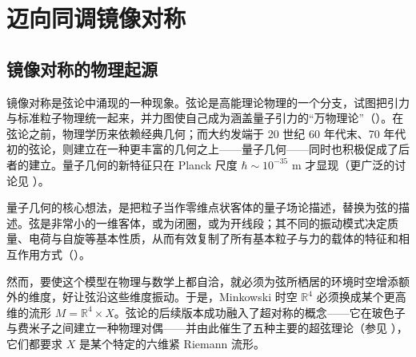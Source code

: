 \section{迈向同调镜像对称}\label{ch:07}

\setcounter{equation}{100}


\subsection{镜像对称的物理起源}\label{sec:7.1}

镜像对称是弦论中涌现的一种现象。弦论是高能理论物理的一个分支，试图把引力与标准粒子物理统一起来，并力图使自己成为涵盖量子引力的“万物理论”（\cite{BBS07}）。在弦论之前，物理学历来依赖经典几何；而大约发端于 20 世纪 60 年代末、70 年代初的弦论，则建立在一种更丰富的几何之上——量子几何——同时也积极促成了后者的建立。量子几何的新特征只在 Planck 尺度 $\hbar\sim10^{-35}$ m 才显现（更广泛的讨论见 \cite{Gre97}）。

量子几何的核心想法，是把粒子当作零维点状客体的量子场论描述，替换为弦的描述。弦是非常小的一维客体，或为闭圈，或为开线段；其不同的振动模式决定质量、电荷与自旋等基本性质，从而有效复制了所有基本粒子与力的载体的特征和相互作用方式（\cite{BBS07}）。

然而，要使这个模型在物理与数学上都自洽，就必须为弦所栖居的环境时空增添额外的维度，好让弦沿这些维度振动。于是，Minkowski 时空 $\mathbb R^4$ 必须换成某个更高维的流形 $M=\mathbb R^4\times X$。弦论的后续版本成功融入了超对称的概念——它在玻色子与费米子之间建立一种物理对偶——并由此催生了五种主要的超弦理论（参见 \cite{Zwi09}），它们都要求 $X$ 是某个特定的六维紧 Riemann 流形。

